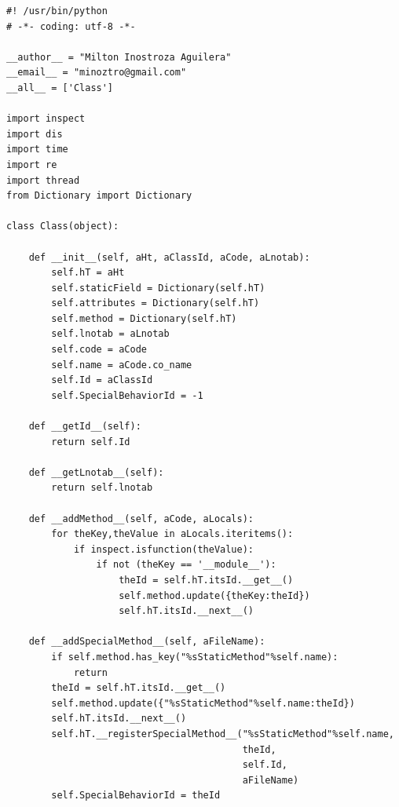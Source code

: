 \documentclass[12pt,legalpaper]{report}
\begin{document}
\begin{singlespace}
\begin{lstlisting}[style=Python]
#! /usr/bin/python
# -*- coding: utf-8 -*-

__author__ = "Milton Inostroza Aguilera"
__email__ = "minoztro@gmail.com"
__all__ = ['Class']

import inspect
import dis
import time
import re
import thread
from Dictionary import Dictionary

class Class(object):

    def __init__(self, aHt, aClassId, aCode, aLnotab):
        self.hT = aHt
        self.staticField = Dictionary(self.hT)
        self.attributes = Dictionary(self.hT)
        self.method = Dictionary(self.hT)
        self.lnotab = aLnotab
        self.code = aCode
        self.name = aCode.co_name
        self.Id = aClassId
        self.SpecialBehaviorId = -1

    def __getId__(self):
        return self.Id

    def __getLnotab__(self):
        return self.lnotab

    def __addMethod__(self, aCode, aLocals):
        for theKey,theValue in aLocals.iteritems():
            if inspect.isfunction(theValue):
                if not (theKey == '__module__'):
                    theId = self.hT.itsId.__get__()
                    self.method.update({theKey:theId})
                    self.hT.itsId.__next__()
    
    def __addSpecialMethod__(self, aFileName):
        if self.method.has_key("%sStaticMethod"%self.name):
            return
        theId = self.hT.itsId.__get__()
        self.method.update({"%sStaticMethod"%self.name:theId})
        self.hT.itsId.__next__()
        self.hT.__registerSpecialMethod__("%sStaticMethod"%self.name,
                                          theId,
                                          self.Id,
                                          aFileName)
        self.SpecialBehaviorId = theId
    

\end{lstlisting}
\end{singlespace}
\end{document}
